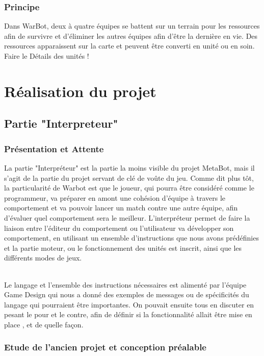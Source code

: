 \documentclass{report}
\begin{document}
\section{Principe}
Dans WarBot, deux à quatre équipes se battent sur un terrain pour les ressources afin de survivre et d'éliminer les autres équipes afin d’être la dernière en vie. Des ressources apparaissent sur la carte et peuvent être converti en unité ou en soin.
 Faire le Détails des unités !
\newpage
\part{Réalisation du projet}
\newpage


\newpage
\chapter{Partie "Interpreteur"}
\section{Présentation et Attente}
La partie "Interpréteur" est la partie la moins visible du projet MetaBot,
mais il s'agit de la partie du projet servant de clé de voûte du jeu.
Comme dit plus tôt, la particularité de Warbot est que le joueur, qui pourra être considéré comme le programmeur, va préparer en amont une cohésion d'équipe à travers le comportement et va pouvoir lancer un match contre une autre équipe, afin d'évaluer quel comportement sera le meilleur.
L'interpréteur permet de faire la liaison entre l'éditeur du comportement ou l'utilisateur va développer son comportement, en utilisant un ensemble d'instructions que nous avons prédéfinies  et la partie moteur, ou le fonctionnement des unités est inscrit, ainsi que les différents modes de jeux.
\paragraph{}
Le langage et l'ensemble des instructions nécessaires est alimenté par l'équipe Game Design qui nous a donné des exemples de messages ou de spécificités du langage qui pourraient être importantes. On pouvait ensuite tous en discuter en pesant le pour et le contre, afin de définir si la fonctionnalité allait être mise en place , et de quelle façon.

\section{Etude de l'ancien projet et conception préalable}
\end{document}
